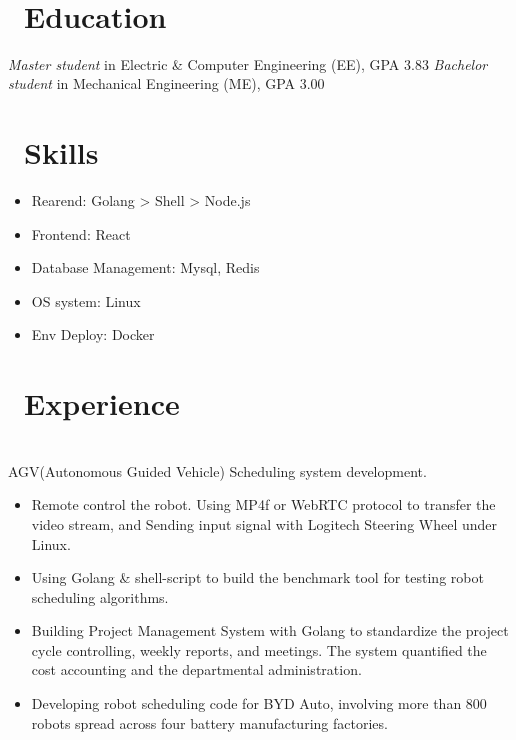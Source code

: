 \documentclass[a4paper,10pt]{resume}
\begin{document}


   \textperiodcentered\

\section{\faGraduationCap\ Education}
\textit{Master student} in Electric \& Computer Engineering (EE), GPA 3.83
\textit{Bachelor student} in Mechanical Engineering (ME), GPA 3.00

\section{\faCogs\ Skills}
\begin{itemize}[parsep=0.5ex]
  \item Rearend: Golang > Shell > Node.js
  \item Frontend: React
  \item Database Management: Mysql, Redis
  \item OS system: Linux
  \item Env Deploy: Docker
\end{itemize}

\section{\faUsers\ Experience}
\role{Software engineer}
\\AGV(Autonomous Guided Vehicle) Scheduling system development.
\begin{itemize}
  \item Remote control the robot. Using MP4f or WebRTC protocol to transfer the video stream, and Sending input signal with Logitech Steering Wheel under Linux.
  \item Using Golang \& shell-script to build the benchmark tool for testing robot scheduling algorithms.
  \item Building Project Management System with Golang to standardize the project cycle controlling, weekly reports, and meetings. The system quantified the cost accounting and the departmental administration.
  \item Developing robot scheduling code for BYD Auto, involving more than 800 robots spread across four battery manufacturing factories.
\end{itemize}
\end{document}
